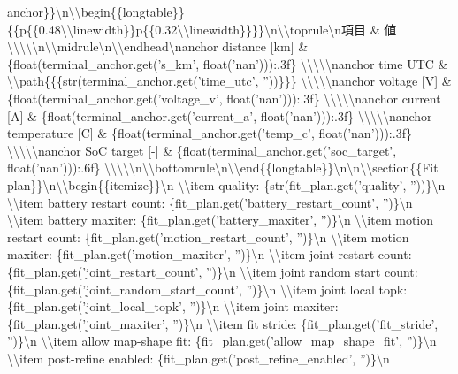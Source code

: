 \documentclass[a4paper,11pt]{article}
\begin{document}
\begin{enumerate}[leftmargin=1.8em]
anchor\}\}\textbackslash{}n\textbackslash{}\textbackslash{}begin\{\{longtable\}\}\{\{p\{\{0.48\textbackslash{}\textbackslash{}linewidth\}\}p\{\{0.32\textbackslash{}\textbackslash{}linewidth\}\}\}\}\textbackslash{}n\textbackslash{}\textbackslash{}toprule\textbackslash{}n項目 \& 値 \textbackslash{}\textbackslash{}\textbackslash{}\textbackslash{}\textbackslash{}n\textbackslash{}\textbackslash{}midrule\textbackslash{}n\textbackslash{}\textbackslash{}endhead\textbackslash{}nanchor distance [km] \& \{float(terminal\_anchor.get('s\_km', float('nan'))):.3f\} \textbackslash{}\textbackslash{}\textbackslash{}\textbackslash{}\textbackslash{}nanchor time UTC \& \textbackslash{}\textbackslash{}path\{\{\{str(terminal\_anchor.get('time\_utc', ''))\}\}\} \textbackslash{}\textbackslash{}\textbackslash{}\textbackslash{}\textbackslash{}nanchor voltage [V] \& \{float(terminal\_anchor.get('voltage\_v', float('nan'))):.3f\} \textbackslash{}\textbackslash{}\textbackslash{}\textbackslash{}\textbackslash{}nanchor current [A] \& \{float(terminal\_anchor.get('current\_a', float('nan'))):.3f\} \textbackslash{}\textbackslash{}\textbackslash{}\textbackslash{}\textbackslash{}nanchor temperature [C] \& \{float(terminal\_anchor.get('temp\_c', float('nan'))):.3f\} \textbackslash{}\textbackslash{}\textbackslash{}\textbackslash{}\textbackslash{}nanchor SoC target [-] \& \{float(terminal\_anchor.get('soc\_target', float('nan'))):.6f\} \textbackslash{}\textbackslash{}\textbackslash{}\textbackslash{}\textbackslash{}n\textbackslash{}\textbackslash{}bottomrule\textbackslash{}n\textbackslash{}\textbackslash{}end\{\{longtable\}\}\textbackslash{}n\textbackslash{}n\textbackslash{}\textbackslash{}section\{\{Fit plan\}\}\textbackslash{}n\textbackslash{}\textbackslash{}begin\{\{itemize\}\}\textbackslash{}n  \textbackslash{}\textbackslash{}item quality: \{str(fit\_plan.get('quality', ''))\}\textbackslash{}n  \textbackslash{}\textbackslash{}item battery restart count: \{fit\_plan.get('battery\_restart\_count', '')\}\textbackslash{}n  \textbackslash{}\textbackslash{}item battery maxiter: \{fit\_plan.get('battery\_maxiter', '')\}\textbackslash{}n  \textbackslash{}\textbackslash{}item motion restart count: \{fit\_plan.get('motion\_restart\_count', '')\}\textbackslash{}n  \textbackslash{}\textbackslash{}item motion maxiter: \{fit\_plan.get('motion\_maxiter', '')\}\textbackslash{}n  \textbackslash{}\textbackslash{}item joint restart count: \{fit\_plan.get('joint\_restart\_count', '')\}\textbackslash{}n  \textbackslash{}\textbackslash{}item joint random start count: \{fit\_plan.get('joint\_random\_start\_count', '')\}\textbackslash{}n  \textbackslash{}\textbackslash{}item joint local topk: \{fit\_plan.get('joint\_local\_topk', '')\}\textbackslash{}n  \textbackslash{}\textbackslash{}item joint maxiter: \{fit\_plan.get('joint\_maxiter', '')\}\textbackslash{}n  \textbackslash{}\textbackslash{}item fit stride: \{fit\_plan.get('fit\_stride', '')\}\textbackslash{}n  \textbackslash{}\textbackslash{}item allow map-shape fit: \{fit\_plan.get('allow\_map\_shape\_fit', '')\}\textbackslash{}n  \textbackslash{}\textbackslash{}item post-refine enabled: \{fit\_plan.get('post\_refine\_enabled', '')\}\textbackslash{}n  
\end{enumerate}
\end{document}
